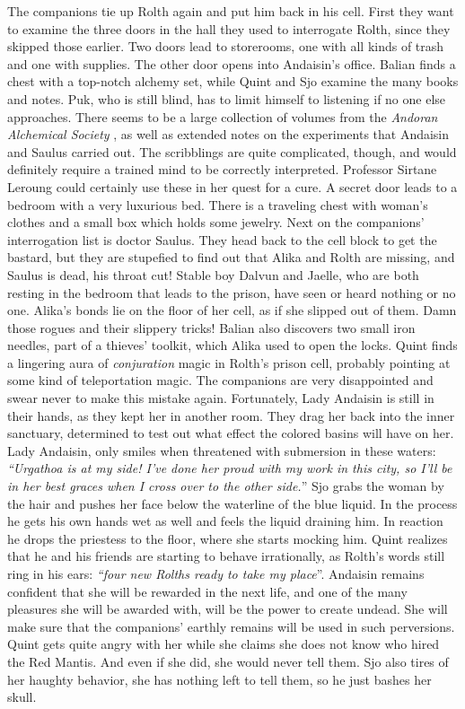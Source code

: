 The companions tie up Rolth again and put him back in his cell. First they want to examine the three doors in the hall they used to interrogate Rolth, since they skipped those earlier. Two doors lead to storerooms, one with all kinds of trash and one with supplies. The other door opens into Andaisin's office. Balian finds a chest with a top-notch alchemy set, while Quint and Sjo examine the many books and notes. Puk, who is still blind, has to limit himself to listening if no one else approaches. There seems to be a large collection of volumes from the {\itshape Andoran Alchemical Society} , as well as extended notes on the experiments that Andaisin and Saulus carried out. The scribblings are quite complicated, though, and would definitely require a trained mind to be correctly interpreted. Professor Sirtane Leroung could certainly use these in her quest for a cure. A secret door leads to a bedroom with a very luxurious bed. There is a traveling chest with woman's clothes and a small box which holds some jewelry. Next on the companions' interrogation list is doctor Saulus. They head back to the cell block to get the bastard, but they are stupefied to find out that Alika and Rolth are missing, and Saulus is dead, his throat cut! Stable boy Dalvun and Jaelle, who are both resting in the bedroom that leads to the prison, have seen or heard nothing or no one. Alika's bonds lie on the floor of her cell, as if she slipped out of them. Damn those rogues and their slippery tricks! Balian also discovers two small iron needles, part of a thieves' toolkit, which Alika used to open the locks. Quint finds a lingering aura of {\itshape conjuration} magic in Rolth's prison cell, probably pointing at some kind of teleportation magic. The companions are very disappointed and swear never to make this mistake again. Fortunately, Lady Andaisin is still in their hands, as they kept her in another room. They drag her back into the inner sanctuary, determined to test out what effect the colored basins will have on her. Lady Andaisin, only smiles when threatened with submersion in these waters: {\itshape``Urgathoa is at my side! I've done her proud with my work in this city, so I'll be in her best graces when I cross over to the other side.}'' Sjo grabs the woman by the hair and pushes her face below the waterline of the blue liquid. In the process he gets his own hands wet as well and feels the liquid draining him. In reaction he drops the priestess to the floor, where she starts mocking him. Quint realizes that he and his friends are starting to behave irrationally, as Rolth's words still ring in his ears: {\itshape``four new Rolths ready to take my place}''. Andaisin remains confident that she will be rewarded in the next life, and one of the many pleasures she will be awarded with, will be the power to create undead. She will make sure that the companions' earthly remains will be used in such perversions. Quint gets quite angry with her while she claims she does not know who hired the Red Mantis. And even if she did, she would never tell them. Sjo also tires of her haughty behavior, she has nothing left to tell them, so he just bashes her skull.\\

